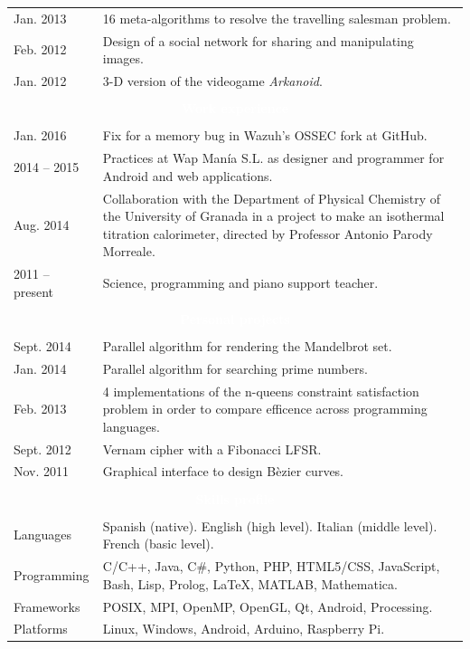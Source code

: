 \documentclass[12pt,a4paper]{article}
\newcommand{\header}[1]{\multicolumn{2}{c}{\cellcolor{black} \textcolor{white} {#1}} \\}
\begin{document}
\begin{longtable}{p{}p{}}
		Jan. 2013 & 16 meta-algorithms to resolve the travelling salesman problem. \\
		Feb. 2012 & Design of a social network for sharing and manipulating images. \\
		Jan. 2012 & 3-D version of the videogame \textit{Arkanoid}. \\
		\\
		\header{\textbf{Work experience}}
		\\
		Jan. 2016 & Fix for a memory bug in Wazuh's OSSEC fork at GitHub. \\
		2014 -- 2015 & Practices at Wap Manía S.L. as designer and programmer 
		for Android and web applications. \\	
		Aug. 2014 & Collaboration with the Department of Physical Chemistry of
		the University of Granada in a project to make an isothermal titration 
		calorimeter, directed by Professor Antonio Parody Morreale. \\
		2011 -- present & Science, programming and piano support teacher. \\
		\\
		\header{\textbf{Personal projects}}
		\\		
		Sept. 2014 & Parallel algorithm for rendering the Mandelbrot set. \\
		Jan. 2014 & Parallel algorithm for searching prime numbers. \\
		Feb. 2013 & 4 implementations of the n-queens constraint satisfaction 
		problem in order to compare efficence across programming languages. \\
		Sept. 2012 & Vernam cipher with a Fibonacci LFSR. \\
		Nov. 2011 & Graphical interface to design Bèzier curves. \\
		\\
		\header{\textbf{Skills profile}}
		\\
		Languages & Spanish (native). \newline
		English (high level). \newline
		Italian (middle level). \newline
		French (basic level). \\
		Programming & C/C++, Java, C\#, Python, PHP, HTML5/CSS, JavaScript, 
		Bash, Lisp, Prolog, LaTeX, MATLAB, Mathematica. \\
		Frameworks & POSIX, MPI, OpenMP, OpenGL, Qt, Android, Processing. \\
		Platforms & Linux, Windows, Android, Arduino, Raspberry Pi. \\

\end{longtable}
\end{document}
